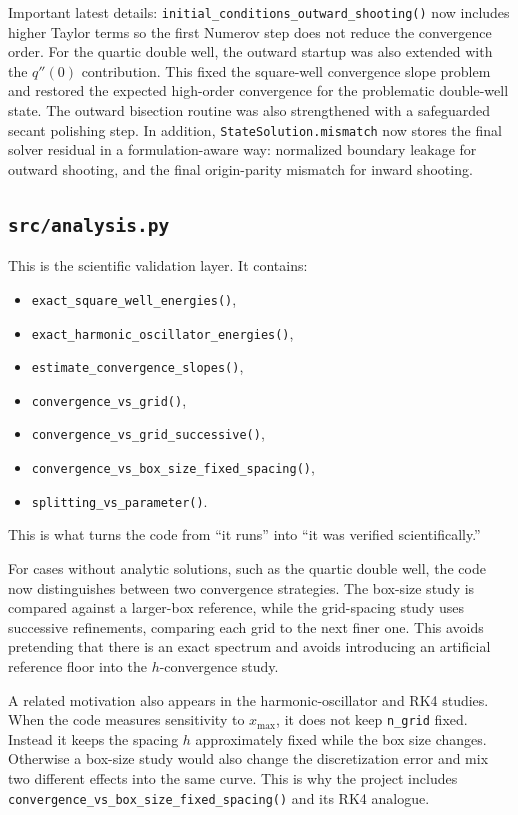 \documentclass[11pt]{article}
\begin{document}
    Important latest details: \texttt{initial\_conditions\_outward\_shooting()} now includes higher Taylor terms so the first Numerov step does not reduce the convergence order. For the quartic double well, the outward startup was also extended with the $q''(0)$ contribution. This fixed the square-well convergence slope problem and restored the expected high-order convergence for the problematic double-well state. The outward bisection routine was also strengthened with a safeguarded secant polishing step. In addition, \texttt{StateSolution.mismatch} now stores the final solver residual in a formulation-aware way: normalized boundary leakage for outward shooting, and the final origin-parity mismatch for inward shooting.

    \subsection{\texttt{src/analysis.py}}

    This is the scientific validation layer. It contains:
    \begin{itemize}
        \item \texttt{exact\_square\_well\_energies()},
        \item \texttt{exact\_harmonic\_oscillator\_energies()},
        \item \texttt{estimate\_convergence\_slopes()},
        \item \texttt{convergence\_vs\_grid()},
        \item \texttt{convergence\_vs\_grid\_successive()},
        \item \texttt{convergence\_vs\_box\_size\_fixed\_spacing()},
        \item \texttt{splitting\_vs\_parameter()}.
    \end{itemize}

    This is what turns the code from ``it runs'' into ``it was verified scientifically.''

    For cases without analytic solutions, such as the quartic double well, the code now distinguishes between two convergence strategies. The box-size study is compared against a larger-box reference, while the grid-spacing study uses successive refinements, comparing each grid to the next finer one. This avoids pretending that there is an exact spectrum and avoids introducing an artificial reference floor into the $h$-convergence study.

    A related motivation also appears in the harmonic-oscillator and RK4 studies. When the code measures sensitivity to $x_{\max}$, it does not keep \texttt{n\_grid} fixed. Instead it keeps the spacing $h$ approximately fixed while the box size changes. Otherwise a box-size study would also change the discretization error and mix two different effects into the same curve. This is why the project includes \texttt{convergence\_vs\_box\_size\_fixed\_spacing()} and its RK4 analogue.
\end{document}
